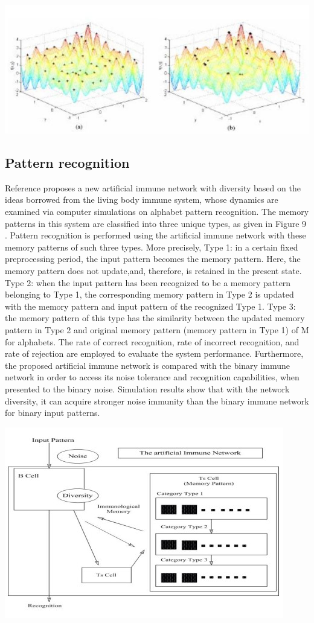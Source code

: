 \documentclass{article}
\begin{document}
\begin{center}
    \includegraphics[width=.6\textwidth]{images/Figure_8.jpg}\\
    \end{center}
\subsection{Pattern recognition}
   Reference proposes a new artificial immune network with diversity based on the ideas borrowed from the living body immune system, whose dynamics are examined via
computer simulations on alphabet pattern recognition. The memory patterns in this system are classified into three unique types, as given in Figure 9 . Pattern recognition is performed using the artificial immune network with these memory patterns of such three types. More precisely, Type 1: in a certain fixed preprocessing period, the input pattern becomes the memory pattern. Here, the memory pattern does not update,and, therefore, is retained in the present state. Type 2: when the input pattern has been recognized to be a memory pattern belonging to Type 1, the corresponding memory pattern in Type 2 is updated with the memory pattern and input pattern of the recognized Type 1. Type 3: the memory pattern of this type has the similarity between the updated memory pattern in Type 2 and original memory pattern (memory pattern in Type 1) of M%
for alphabets. The rate of correct recognition, rate of incorrect recognition, and rate of rejection are employed to evaluate the system performance. Furthermore, the proposed artificial immune network is compared with the binary immune network in order to access its noise tolerance and recognition capabilities, when presented to the binary noise. Simulation results show that with the network diversity, it can acquire stronger noise immunity than the binary immune network for binary input patterns.
    \begin{center}
    \includegraphics[width=.6\textwidth]{images/Figure_9.jpg}\\
    \end{center}
\end{document}
